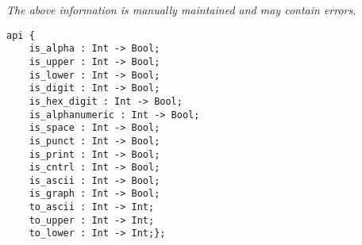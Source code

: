 \label{api:Int\_Chartype}

{\tiny \it The above information is manually maintained and may contain errors.}
\begin{verbatim}
api {
    is_alpha : Int -> Bool;
    is_upper : Int -> Bool;
    is_lower : Int -> Bool;
    is_digit : Int -> Bool;
    is_hex_digit : Int -> Bool;
    is_alphanumeric : Int -> Bool;
    is_space : Int -> Bool;
    is_punct : Int -> Bool;
    is_print : Int -> Bool;
    is_cntrl : Int -> Bool;
    is_ascii : Int -> Bool;
    is_graph : Int -> Bool;
    to_ascii : Int -> Int;
    to_upper : Int -> Int;
    to_lower : Int -> Int;};
\end{verbatim}
